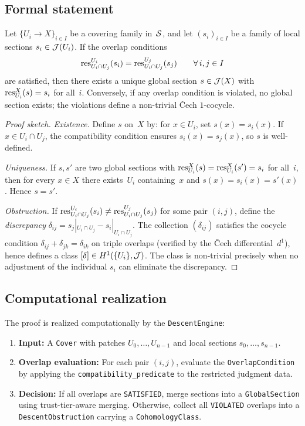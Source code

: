 \documentclass[11pt]{article}
\begin{document}
\subsection{Formal statement}

\begin{theorem}\label{thm:descent}
Let\/ $\{U_i \to X\}_{i \in I}$ be a covering family in~$\mathcal{S}$, and let
$(s_i)_{i \in I}$ be a family of local sections $s_i \in \mathcal{J}(U_i)$.  If the
overlap conditions
\[
  \mathrm{res}^{U_i}_{U_i \cap U_j}(s_i) = \mathrm{res}^{U_j}_{U_i \cap U_j}(s_j)
  \qquad \forall\, i, j \in I
\]
are satisfied, then there exists a unique global section $s \in \mathcal{J}(X)$ with
$\mathrm{res}^X_{U_i}(s) = s_i$ for all~$i$.  Conversely, if any overlap condition
is violated, no global section exists; the violations define a non-trivial
\v{C}ech $1$-cocycle.
\end{theorem}

\begin{proof}[Proof sketch]
\emph{Existence.}  Define $s$ on~$X$ by: for $x \in U_i$, set $s(x) =
s_i(x)$.  If $x \in U_i \cap U_j$, the compatibility condition ensures
$s_i(x) = s_j(x)$, so $s$ is well-defined.

\emph{Uniqueness.}  If $s, s'$ are two global sections with
$\mathrm{res}^X_{U_i}(s) = \mathrm{res}^X_{U_i}(s') = s_i$ for all~$i$, then for every
$x \in X$ there exists~$U_i$ containing~$x$ and $s(x) = s_i(x) = s'(x)$.
Hence $s = s'$.

\emph{Obstruction.}  If $\mathrm{res}^{U_i}_{U_i \cap U_j}(s_i) \neq
\mathrm{res}^{U_j}_{U_i \cap U_j}(s_j)$ for some pair $(i,j)$, define the
\emph{discrepancy} $\delta_{ij} = s_j|_{U_i \cap U_j} - s_i|_{U_i \cap
U_j}$.  The collection $(\delta_{ij})$ satisfies the cocycle condition
$\delta_{ij} + \delta_{jk} = \delta_{ik}$ on triple overlaps (verified by
the \v{C}ech differential~$d^1$), hence defines a class
$[\delta] \in H^{1}(\{U_i\}, \mathcal{J})$.  The class is non-trivial precisely
when no adjustment of the individual $s_i$ can eliminate the discrepancy.
\end{proof}

\subsection{Computational realization}

The proof is realized computationally by the \texttt{DescentEngine}:

\begin{enumerate}[leftmargin=*]
\item \textbf{Input:} A \texttt{Cover} with patches $U_0, \ldots, U_{n-1}$
  and local sections $s_0, \ldots, s_{n-1}$.
\item \textbf{Overlap evaluation:} For each pair $(i,j)$, evaluate the
  \texttt{OverlapCondition} by applying the \texttt{compatibility\_predicate}
  to the restricted judgment data.
\item \textbf{Decision:} If all overlaps are \texttt{SATISFIED}, merge
  sections into a \texttt{GlobalSection} using trust-tier-aware merging.
  Otherwise, collect all \texttt{VIOLATED} overlaps into a
  \texttt{DescentObstruction} carrying a \texttt{CohomologyClass}.
\end{enumerate}
\end{document}
